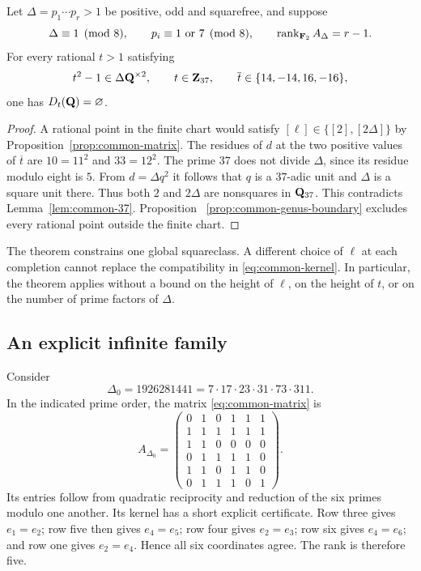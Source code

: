 \begin{theorem}\label{thm:common-exclusion}\label{thm:common-squareclass}
Let $\Delta=p_1\cdots p_r>1$ be positive, odd and squarefree, and suppose
\[
 \Delta\equiv1\pmod8,\qquad
 p_i\equiv1\text{ or }7\pmod8,\qquad
 \operatorname{rank}_{\mathbf F_2}A_\Delta=r-1.
\]
For every rational $t>1$ satisfying
\begin{equation}\label{eq:common-excluded-t}
 t^2-1\in\Delta\mathbf Q^{\times2},\qquad t\in\mathbf Z_{37},\qquad
 \overline t\in\{14,-14,16,-16\},
\end{equation}
one has $D_t(\mathbf Q)=\varnothing$.
\end{theorem}
\begin{proof}
A rational point in the finite chart would satisfy
$[\ell]\in\{[2],[2\Delta]\}$ by Proposition~\ref{prop:common-matrix}.
The residues of $d$ at the two positive values of $\overline t$ are
$10=11^2$ and $33=12^2$.  The prime $37$ does not divide $\Delta$,
since its residue modulo eight is $5$.  From $d=\Delta q^2$ it follows
that $q$ is a $37$-adic unit and $\Delta$ is a square unit there.
Thus both $2$ and $2\Delta$ are nonsquares in $\mathbf Q_{37}$.
This contradicts Lemma~\ref{lem:common-37}.  Proposition~
\ref{prop:common-genus-boundary} excludes every rational point outside
the finite chart.
\end{proof}

The theorem constrains one global squareclass.  A different choice of
$\ell$ at each completion cannot replace the compatibility in
\eqref{eq:common-kernel}.  In particular, the theorem applies without a
bound on the height of $\ell$, on the height of $t$, or on the number of
prime factors of $\Delta$.

\subsection{An explicit infinite family}

Consider
\[
 \Delta_0=1926281441=7\cdot17\cdot23\cdot31\cdot73\cdot311.
\]
In the indicated prime order, the matrix \eqref{eq:common-matrix} is
\begin{equation}\label{eq:common-six-matrix}
 A_{\Delta_0}=\begin{pmatrix}
 0&1&0&1&1&1\\
 1&1&1&1&1&1\\
 1&1&0&0&0&0\\
 0&1&1&1&1&0\\
 1&1&0&1&1&0\\
 0&1&1&1&0&1
 \end{pmatrix}.
\end{equation}
Its entries follow from quadratic reciprocity and reduction of the six
primes modulo one another.  Its kernel has a short explicit
certificate.  Row three gives $e_1=e_2$; row five then gives
$e_4=e_5$; row four gives $e_2=e_3$; row six gives $e_4=e_6$;
and row one gives $e_2=e_4$.  Hence all six coordinates agree.
The rank is therefore five.


